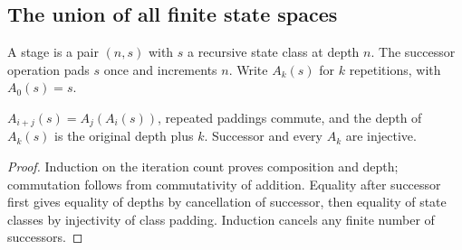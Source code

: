 


\subsection{The union of all finite state spaces}



\begin{definition}
A stage is a pair $(n,s)$ with $s$ a recursive state class at depth $n$. The successor operation pads $s$ once and increments $n$. Write $A_k(s)$ for $k$ repetitions, with $A_0(s)=s$.
\end{definition}





\begin{lemma}
$A_{i+j}(s)=A_j(A_i(s))$, repeated paddings commute, and the depth of $A_k(s)$ is the original depth plus $k$. Successor and every $A_k$ are injective.
\end{lemma}

\begin{proof}
Induction on the iteration count proves composition and depth; commutation follows from commutativity of addition. Equality after successor first gives equality of depths by cancellation of successor, then equality of state classes by injectivity of class padding. Induction cancels any finite number of successors.
\end{proof}







